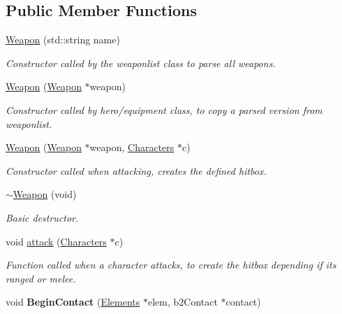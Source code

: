 \subsection*{Public Member Functions}
\begin{DoxyCompactItemize}
\item 
\hyperlink{class_weapon_a7267e890fa563b4f2df8746f443b461a}{Weapon} (std\+::string name)
\begin{DoxyCompactList}\small\item\em Constructor called by the weaponlist class to parse all weapons. \end{DoxyCompactList}\item 
\hyperlink{class_weapon_a559c41dbcc415a6ee70112f5231ef83b}{Weapon} (\hyperlink{class_weapon}{Weapon} $\ast$weapon)
\begin{DoxyCompactList}\small\item\em Constructor called by hero/equipment class, to copy a parsed version from weaponlist. \end{DoxyCompactList}\item 
\hyperlink{class_weapon_aa3eb21f28f64908763402004fa802b36}{Weapon} (\hyperlink{class_weapon}{Weapon} $\ast$weapon, \hyperlink{class_characters}{Characters} $\ast$c)
\begin{DoxyCompactList}\small\item\em Constructor called when attacking, creates the defined hitbox. \end{DoxyCompactList}\item 
\hypertarget{class_weapon_aa3364fb5092bbdb4c215e02dd1494f10}{\hyperlink{class_weapon_aa3364fb5092bbdb4c215e02dd1494f10}{$\sim$\+Weapon} (void)}\label{class_weapon_aa3364fb5092bbdb4c215e02dd1494f10}

\begin{DoxyCompactList}\small\item\em Basic destructor. \end{DoxyCompactList}\item 
void \hyperlink{class_weapon_a90b2b26acbbfc87a14786c8859e4a01d}{attack} (\hyperlink{class_characters}{Characters} $\ast$c)
\begin{DoxyCompactList}\small\item\em Function called when a character attacks, to create the hitbox depending if its ranged or melee. \end{DoxyCompactList}\item 
\hypertarget{class_weapon_a866884395ed4c0e7a972bb18e8d7d030}{void {\bfseries Begin\+Contact} (\hyperlink{class_elements}{Elements} $\ast$elem, b2\+Contact $\ast$contact)}\label{class_weapon_a866884395ed4c0e7a972bb18e8d7d030}


\end{DoxyCompactItemize}
